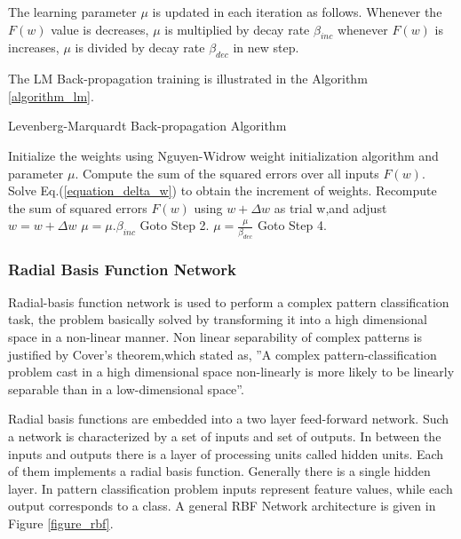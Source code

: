 \documentclass[12pt,a4paper,oneside]{article}
\numberwithin{equation}{section}
\numberwithin{algorithm}{section}
\begin{document}
The learning parameter $\mu$ is updated in each iteration as follows. Whenever the $F(w)$ value is decreases, $\mu$ is multiplied by decay rate $\beta_{inc}$ whenever $F(w)$ is increases, $\mu$ is divided by decay rate $\beta_{dec}$ in new step.

The LM Back-propagation training is illustrated in the Algorithm \ref{algorithm_lm}.

\begin{algorithm}
\caption{Levenberg-Marquardt Back-propagation Algorithm}
\label{algorithm_lm}
\begin{algorithmic}[1]
\STATE Initialize the weights using Nguyen-Widrow weight initialization algorithm and parameter $\mu$.
\STATE Compute the sum of the squared errors over all inputs $F(w)$.
\STATE Solve Eq.(\ref{equation_delta_w}) to obtain the increment of weights.
\STATE Recompute the sum of squared errors $F(w)$ using $w+\Delta{w}$ as trial w,and adjust
\STATE $w=w+\Delta{w}$
\STATE $\mu=\mu.\beta_{inc}$
\STATE Goto Step 2.
\ELSE
\STATE $\mu=\frac{\mu}{\beta_{dec}}$
\STATE  Goto Step 4.
\ENDIF
\end{algorithmic}
\end{algorithm}

\newpage
\subsubsection{Radial Basis Function Network}
\label{radial_basis_function}

Radial-basis function network is used to perform a complex pattern classification task, the problem basically solved by transforming it into a high dimensional space in a non-linear manner. Non linear separability of complex patterns is justified by Cover's theorem,which stated as, ''A complex pattern-classification problem cast in a high dimensional space non-linearly is more likely to be linearly separable than in a low-dimensional space''.

Radial basis functions are embedded into a two layer feed-forward network. Such a  network is characterized by a set of inputs and set of outputs. In between the inputs and outputs there is a layer of processing units called hidden units. Each of them implements a radial basis function. Generally there is a single hidden layer. In pattern classification problem inputs represent feature values, while each output corresponds to a class. A general RBF Network architecture is given in Figure \ref{figure_rbf}.
\end{document}
